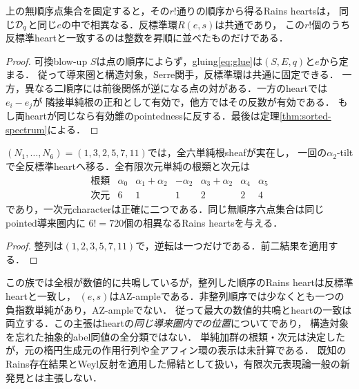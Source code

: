 \begin{corollary}\label{cor:permuted-hearts}
上の無順序点集合を固定すると，その$r!$通りの順序から得るRains heartsは，
同じ$\mathcal D_q$と同じ$e$の中で相異なる．反標準環$R(e,s)$は共通であり，
この$r!$個のうち反標準heartと一致するのは整数を昇順に並べたものだけである．
\end{corollary}
\begin{proof}
可換blow-up $S$は点の順序によらず，gluing\eqref{eq:glue}は$(S,E,q)$と$e$から定まる．
従って導来圏と構造対象，Serre関手，反標準環は共通に固定できる．
一方，異なる二順序には前後関係が逆になる点の対がある．一方のheartでは$e_i-e_j$が
隣接単純根の正和として有効で，他方ではその反数が有効である．
もし両heartが同じなら有効錐のpointednessに反する．最後は定理\ref{thm:sorted-spectrum}による．
\end{proof}

\begin{corollary}[六点の具体例]\label{cor:E6spectrum}
$(N_1,\ldots,N_6)=(1,3,2,5,7,11)$では，全六単純根sheafが実在し，
一回の$\alpha_2$-tiltで全反標準heartへ移る．全有限次元単純の根類と次元は
\[
\begin{array}{c|rrrrrr}
\text{根類}&\alpha_0&\alpha_1+\alpha_2&-\alpha_2&\alpha_3+\alpha_2&\alpha_4&\alpha_5\\\hline
\text{次元}&6&1&1&2&2&4
\end{array}
\]
であり，一次元characterは正確に二つである．同じ無順序六点集合は同じpointed導来圏内に
$6!=720$個の相異なるRains heartsを与える．
\end{corollary}
\begin{proof}
整列は$(1,2,3,5,7,11)$で，逆転は一つだけである．前二結果を適用する．
\end{proof}
\begin{remark}[共鳴とheartの不一致は同義ではない]
この族では全根が数値的に共鳴しているが，整列した順序のRains heartは反標準heartと一致し，
$(e,s)$はAZ-ampleである．非整列順序では少なくとも一つの負指数単純があり，AZ-ampleでない．
従って最大の数値的共鳴とheartの一致は両立する．この主張はheartの\emph{同じ導来圏内での位置}についてであり，
構造対象を忘れた抽象的abel同値の全分類ではない．
単純加群の根類・次元は決定したが，元の楕円生成元の作用行列や全アフィン環の表示は未計算である．
既知のRains存在結果とWeyl反射を適用した帰結として扱い，有限次元表現論一般の新発見とは主張しない．
\end{remark}
